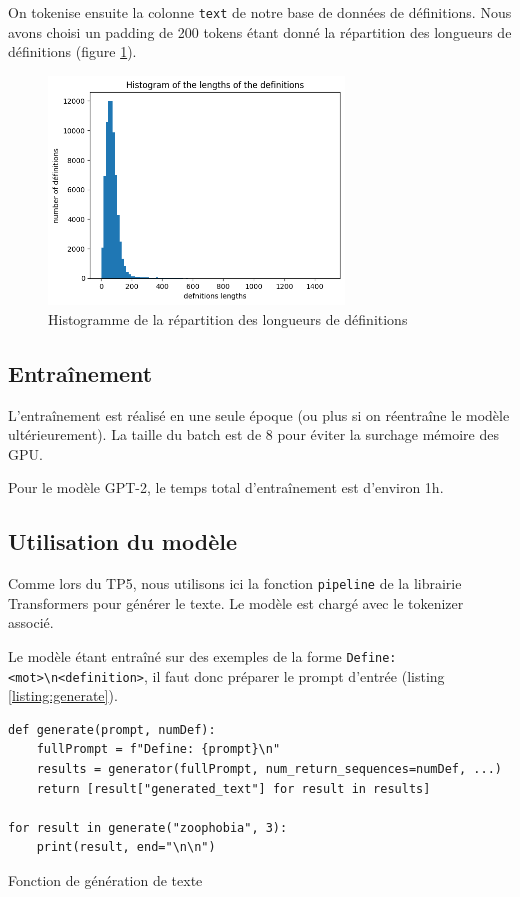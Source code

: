 \documentclass[french]{template}
\begin{document}
On tokenise ensuite la colonne \texttt{text} de notre base de données de définitions. Nous avons choisi un padding de 200 tokens étant donné la répartition des longueurs de définitions (figure \ref{fig:lengths}).

\begin{figure}[H]
    \centering
    \includegraphics[width=0.7\textwidth]{img/lengths.png}
    \caption{Histogramme de la répartition des longueurs de définitions}
    \label{fig:lengths}
\end{figure}

\subsection{Entraînement}

L'entraînement est réalisé en une seule époque (ou plus si on réentraîne le modèle ultérieurement). La taille du batch est de 8 pour éviter la surchage mémoire des GPU.

Pour le modèle GPT-2, le temps total d'entraînement est d'environ 1h.

\subsection{Utilisation du modèle}

Comme lors du TP5, nous utilisons ici la fonction \texttt{pipeline} de la librairie Transformers pour générer le texte. Le modèle est chargé avec le tokenizer associé.

Le modèle étant entraîné sur des exemples de la forme \texttt{Define: \textless mot\textgreater\textbackslash n\textless definition\textgreater}, il faut donc préparer le prompt d'entrée (listing \ref{listing:generate}).

\begin{listing}[H]
    \begin{verbatim}
def generate(prompt, numDef):
    fullPrompt = f"Define: {prompt}\n"
    results = generator(fullPrompt, num_return_sequences=numDef, ...)
    return [result["generated_text"] for result in results]

for result in generate("zoophobia", 3):
    print(result, end="\n\n")
    \end{verbatim}
    \caption{Fonction de génération de texte}
    \label{listing:generate}
\end{listing}
\end{document}
